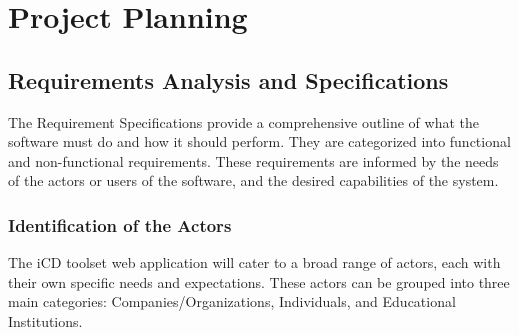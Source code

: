 \chapter{Project Planning}
\minitoc
\newpage


\setcounter{secnumdepth}{2} %
\section{Requirements Analysis and Specifications}
The Requirement Specifications provide a comprehensive outline of what the software must do and how it should perform. They are categorized into functional and non-functional requirements. These requirements are informed by the needs of the actors or users of the software, and the desired capabilities of the system.

\subsection{Identification of the Actors}
The iCD toolset web application will cater to a broad range of actors, each with their own specific needs and expectations. These actors can be grouped into three main categories: Companies/Organizations, Individuals, and Educational Institutions.


